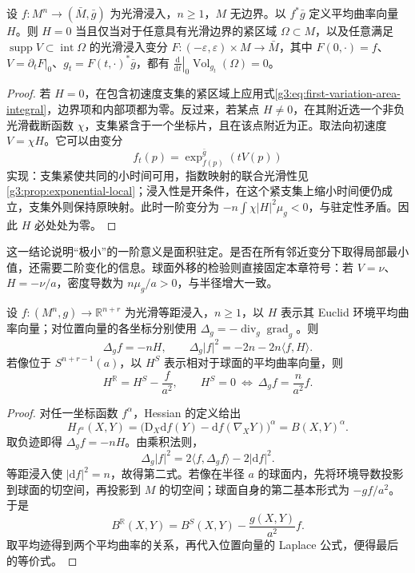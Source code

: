\begin{corollary}\label{g3:cor:minimal-area-stationarity}
	设 \(f:M^n\to(\bar M,\bar g)\) 为光滑浸入，\(n\ge1\)，\(M\) 无边界。以 \(f^*\bar g\) 定义平均曲率向量 \(H\)。则 \(H=0\) 当且仅当对于任意具有光滑边界的紧区域 \(\Omega\subset M\)，以及任意满足 \(\operatorname{supp}V\subset\operatorname{int}\Omega\) 的光滑浸入变分 \(F:(-\varepsilon,\varepsilon)\times M\to\bar M\)，其中 \(F(0,\cdot)=f\)、\(V=\partial_tF|_0\)、\(g_t=F(t,\cdot)^*\bar g\)，都有 \(\left.\frac{\mathrm d}{\mathrm dt}\right|_0\operatorname{Vol}_{g_t}(\Omega)=0\)。
\end{corollary}
\begin{proof}
	若 \(H=0\)，在包含初速度支集的紧区域上应用式\eqref{g3:eq:first-variation-area-integral}，边界项和内部项都为零。反过来，若某点 \(H\ne0\)，在其附近选一个非负光滑截断函数 \(\chi\)，支集紧含于一个坐标片，且在该点附近为正。取法向初速度 \(V=\chi H\)。它可以由变分
	\[
		f_t(p)=\exp^{\bar g}_{f(p)}(tV(p))
	\]
	实现：支集紧使共同的小时间可用，指数映射的联合光滑性见\cref{g3:prop:exponential-local}；浸入性是开条件，在这个紧支集上缩小时间便仍成立，支集外则保持原映射。此时一阶变分为 \(-n\int\chi|H|^2\mu_g<0\)，与驻定性矛盾。因此 \(H\) 必处处为零。
\end{proof}

这一结论说明“极小”的一阶意义是面积驻定。是否在所有邻近变分下取得局部最小值，还需要二阶变化的信息。球面外移的检验则直接固定本章符号：若 \(V=\nu\)、\(H=-\nu/a\)，密度导数为 \(n\mu_g/a>0\)，与半径增大一致。

\begin{proposition}\label{g3:prop:immersion-position-laplacian}
	设 \(f:(M^n,g)\to\mathbb R^{n+r}\) 为光滑等距浸入，\(n\ge1\)，以 \(H\) 表示其 Euclid 环境平均曲率向量；对位置向量的各坐标分别使用 \(\Delta_g=-\operatorname{div}_g\operatorname{grad}_g\)。则
	\begin{equation}\label{g3:eq:position-laplacian}
		\Delta_g f=-nH,\qquad
		\Delta_g|f|^2=-2n-2n\langle f,H\rangle.
	\end{equation}
	若像位于 \(S^{n+r-1}(a)\)，以 \(H^S\) 表示相对于球面的平均曲率向量，则
	\begin{equation}\label{g3:eq:spherical-minimal-eigenmap}
		H^{\mathbb R}=H^S-\frac f{a^2},\qquad
		H^S=0\ \Longleftrightarrow\ \Delta_g f=\frac n{a^2}f.
	\end{equation}
\end{proposition}
\begin{proof}
	对任一坐标函数 \(f^\alpha\)，Hessian 的定义给出
	\[
		H_{f^\alpha}(X,Y)
		=\bigl(\mathrm D_X\mathrm df(Y)-\mathrm df(\nabla_XY)\bigr)^\alpha
		=B(X,Y)^\alpha.
	\]
	取负迹即得 \(\Delta_g f=-nH\)。由乘积法则，
	\[
		\Delta_g|f|^2=2\langle f,\Delta_g f\rangle-2|\mathrm df|^2.
	\]
	等距浸入使 \(|\mathrm df|^2=n\)，故得第二式。若像在半径 \(a\) 的球面内，先将环境导数投影到球面的切空间，再投影到 \(M\) 的切空间；球面自身的第二基本形式为 \(-g f/a^2\)。于是
	\[
		B^{\mathbb R}(X,Y)=B^S(X,Y)-\frac{g(X,Y)}{a^2}f.
	\]
	取平均迹得到两个平均曲率的关系，再代入位置向量的 Laplace 公式，便得最后的等价式。
\end{proof}

